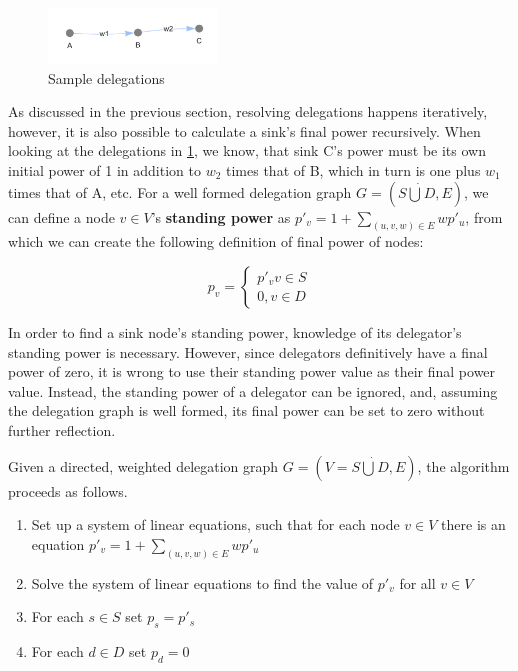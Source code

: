 \begin{figure}[h]
	\centering
	\includegraphics[width=0.4\textwidth]{delegation_graph_sample}
	\caption{Sample delegations}
	\label{fig:sample_delegations}
\end{figure}

As discussed in the previous section, resolving delegations happens iteratively, however, it is also possible to calculate a sink's final power recursively. When looking at the delegations in \cref{fig:sample_delegations}, we know, that sink C's power must be its own initial power of 1 in addition to $w_2$ times that of B, which in turn is one plus $w_1$ times that of A, etc. For a well formed delegation graph $G=(S\dot\bigcup D, E)$, we can define a node $v \in V$'s \textbf{standing power} as $p'_v = 1 + \sum_{(u, v, w) \in E} wp'_u$, from which we can create the following definition of final power of nodes:

\[
p_v = 
\begin{cases}
 p'_v v \in S \\ 
 0, v \in D 
 \end{cases}
\]

In order to find a sink node's standing power, knowledge of its delegator's standing power is necessary. However, since delegators definitively have a final power of zero, it is wrong to use their standing power value as their final power value. Instead, the standing power of a delegator can be ignored, and, assuming the delegation graph is well formed, its final power can be set to zero without further reflection. 

Given a directed, weighted delegation graph $G = (V = S \dot\bigcup D, E)$, the algorithm proceeds as follows.

\begin{enumerate}
\item Set up a system of linear equations, such that for each node $v \in V$ there is an equation $p'_v = 1+\sum_{(u, v, w) \in E}wp'_u$
\item Solve the system of linear equations to find the value of $p'_v$ for all $v \in V$
\item For each $s \in S$ set $p_s = p'_s$
\item For each $d \in D$ set $p_d = 0$
\end{enumerate}

